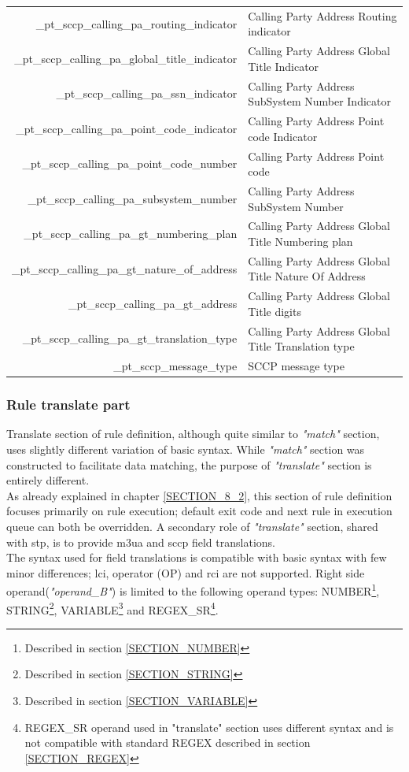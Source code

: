 \documentclass[a4paper,latin]{paper}
\begin{document}
\begin{tabularx}{\linewidth}{ | >{\ttfamily} r | >{\ttfamily} X |}
	\_pt\_sccp\_calling\_pa\_routing\_indicator		& Calling Party Address Routing indicator \\
	\_pt\_sccp\_calling\_pa\_global\_title\_indicator	& Calling Party Address Global Title Indicator \\
	\_pt\_sccp\_calling\_pa\_ssn\_indicator			& Calling Party Address SubSystem Number Indicator \\
	\_pt\_sccp\_calling\_pa\_point\_code\_indicator		& Calling Party Address Point code Indicator \\
	\_pt\_sccp\_calling\_pa\_point\_code\_number		& Calling Party Address Point code \\
	\_pt\_sccp\_calling\_pa\_subsystem\_number		& Calling Party Address SubSystem Number \\
	\_pt\_sccp\_calling\_pa\_gt\_numbering\_plan		& Calling Party Address Global Title Numbering plan \\
	\_pt\_sccp\_calling\_pa\_gt\_nature\_of\_address	& Calling Party Address Global Title Nature Of Address \\
	\_pt\_sccp\_calling\_pa\_gt\_address			& Calling Party Address Global Title digits \\
	\_pt\_sccp\_calling\_pa\_gt\_translation\_type		& Calling Party Address Global Title Translation type \\
	\_pt\_sccp\_message\_type				& SCCP message type\\
	\hline
\end{tabularx}%
\clearpage

\subsubsection{Rule translate part}
Translate section of rule definition, although quite similar to \textit{"match"} section, uses slightly different variation of basic syntax. While \textit{"match"} section was constructed 
to facilitate data matching, the purpose of \textit{"translate"} section is entirely different.\\

As already explained in chapter \ref{SECTION_8_2}, this section of rule definition focuses primarily on rule execution; default exit code and next rule in execution queue can both be
overridden. A secondary role of \textit{"translate"} section, shared with \acrfull{stp}, is to provide \acrfull{m3ua} and \acrfull{sccp} field translations.\\

The syntax used for field translations is compatible with basic syntax with few minor differences; \acrfull{lci}, operator (OP) and \acrfull{rci} are not supported. Right side 
operand(\textit{"operand\_B"}) is limited to the following operand types: NUMBER\footnote{Described in section \ref{SECTION_NUMBER}}, STRING\footnote{Described in section \ref{SECTION_STRING}}, 
VARIABLE\footnote{Described in section \ref{SECTION_VARIABLE}} and REGEX\_SR\footnote{REGEX\_SR operand used in "translate" section uses different syntax and is not compatible with standard REGEX 
described in section \ref{SECTION_REGEX}}.\\
\end{document}
